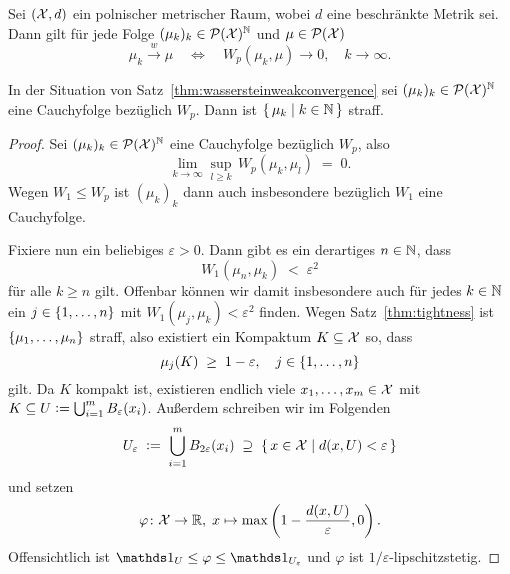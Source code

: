\documentclass[../main/main.tex]{subfiles}
\begin{document}
	\begin{Satz}
		\label{thm:wassersteinweakconvergence}
		Sei $(\mathcal{X}, d)$ ein polnischer metrischer Raum, wobei $d$ eine beschränkte Metrik sei. Dann gilt
		für jede Folge $(\mu_k)_k \in \mathcal{P}(\mathcal{X})^{\mathbb{N}}$ und $\mu \in \mathcal{P}(\mathcal{X})$
		\[ \mu_k \xrightarrow{w} \mu \quad \iff \quad W_p(\mu_k, \mu) \to 0, \quad k \to \infty \text{.} \]
	\end{Satz}

	\begin{Hilfssatz}
		\label{lem:wassersteincauchyseq}
		In der Situation von Satz~\ref{thm:wassersteinweakconvergence} sei $(\mu_k)_k \in \mathcal{P}(\mathcal{X})^{\mathbb{N}}$ eine Cauchyfolge
		bezüglich $W_p$. Dann ist $\left\{\, \mu_k \; \middle| \; k \in \mathbb{N} \,\right\}$ straff.
	\end{Hilfssatz}

	\begin{proof}
		Sei $(\mu_k)_k \in \mathcal{P}(\mathcal{X})^{\mathbb{N}}$ eine Cauchyfolge bezüglich $W_p$, also
		\[ \lim_{k \to \infty} \sup_{l \geq k} \, W_p(\mu_k, \mu_l) \; = \; 0 \text{.} \]
		Wegen $W_1 \leq W_p$ ist $(\mu_k)_k$ dann auch insbesondere bezüglich $W_1$ eine Cauchyfolge. 
		
		Fixiere nun ein beliebiges $\varepsilon > 0$. Dann gibt es ein derartiges $n \in \mathbb{N}$, dass 
		\[ W_1(\mu_n, \mu_k) \; < \; \varepsilon^2 \]
		für alle $k \geq n$ gilt. Offenbar können wir damit insbesondere auch für jedes $k \in \mathbb{N}$ ein $j \in \left\{1, \dots, n\right\}$ mit
		$W_1(\mu_j, \mu_k) < \varepsilon^2$ finden. Wegen Satz~\ref{thm:tightness} ist $\left\{\mu_1, \dots, \mu_n\right\}$ straff, also existiert ein Kompaktum
		$K \subseteq \mathcal{X}$ so, dass
		\[ \mu_j(K) \; \geq \; 1 - \varepsilon, \quad j \in \left\{1, \dots, n\right\} \]
		gilt. Da $K$ kompakt ist, existieren endlich viele $x_1, \dots, x_m \in \mathcal{X}$ mit 
		$K \subseteq U \vcentcolon = \bigcup_{i=1}^{m} B_{\varepsilon}(x_i)$.
		Außerdem schreiben wir im Folgenden 
		\[ U_{\varepsilon} \; \vcentcolon = \; \bigcup_{i=1}^{m} B_{2\varepsilon}(x_i) \; \supseteq \; \left\{\, x \in \mathcal{X} \; \middle| \; d(x, U) < \varepsilon \,\right\} \] 
		und setzen 
		\[ \varphi \colon \mathcal{X} \to \mathbb{R}, \; x \mapsto \max \left( 1-\frac{d(x, U)}{\varepsilon}, 0 \right)  \text{.} \]
		Offensichtlich ist $\indfct_U \leq \varphi \leq \indfct_{U_\varepsilon}$ und $\varphi$ ist $1/\varepsilon$-lipschitzstetig.
		

\end{proof}
\end{document}
